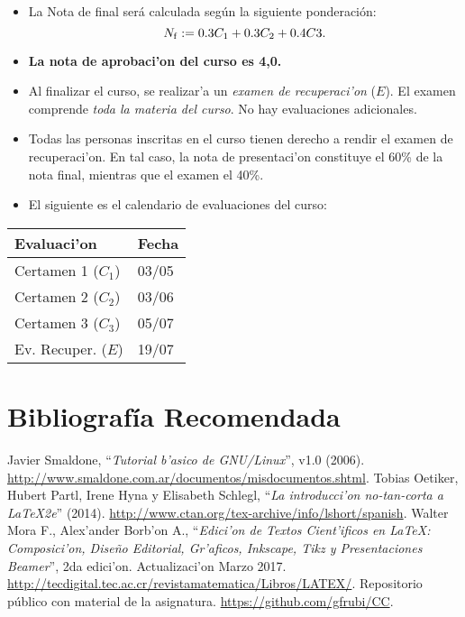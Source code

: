 \documentclass[letterpaper,11pt]{exam}
\begin{document}
\begin{multicols}{2}
\begin{itemize}
\item La Nota de final ser\'a calculada seg\'un la siguiente ponderaci\'on:
{\small
\begin{equation}
N_{\rm f} :=0.3C_1+0.3C_2 + 0.4C3.
\end{equation}
}
\item \textbf{La nota de aprobaci'on del curso es 4,0.}
\item Al finalizar el curso, se realizar'a un \textit{examen de recuperaci'on} ($E$). El examen comprende \textit{toda la materia del curso}. No hay evaluaciones adicionales.
\item Todas las personas inscritas en el curso tienen derecho a rendir el examen de recuperaci'on. En tal caso, la nota de presentaci'on constituye el 60\% de la nota final, mientras que el examen el 40\%.

\item El siguiente es el calendario de evaluaciones del curso:
\end{itemize} 
\begin{center}
\begin{scriptsize}
\begin{tabular}{|ll|}
\hline 
Evaluaci'on &  Fecha\\
\hline
Certamen 1 ($C_1$) & 03/05 \\ 
Certamen 2 ($C_2$) & 03/06 \\ 
Certamen 3 ($C_3$) & 05/07\\ 
Ev. Recuper. ($E$) & 19/07 \\ 
\hline 
\end{tabular} 
\end{scriptsize}
\end{center}

\section{Bibliografía Recomendada}

\begin{thebibliography}{77}	%
\small
{} Javier Smaldone, ``\textit{Tutorial b'asico de GNU/Linux}'',  v1.0 (2006).
\url{http://www.smaldone.com.ar/documentos/misdocumentos.shtml}.
 Tobias Oetiker, Hubert Partl, Irene Hyna y Elisabeth Schlegl, ``\textit{La introducci'on no-tan-corta a \LaTeX 2e}'' (2014). \url{http://www.ctan.org/tex-archive/info/lshort/spanish}.
 Walter Mora F., Alex'ander Borb'on A., ``\textit{Edici'on de Textos Cient'ificos en \LaTeX: Composici'on, Dise\~no Editorial, Gr'aficos, Inkscape, Tikz y Presentaciones Beamer}'', 2da edici'on. Actualizaci'on Marzo 2017. \url{http://tecdigital.tec.ac.cr/revistamatematica/Libros/LATEX/}.
 Repositorio p\'ublico con material de la asignatura. \url{https://github.com/gfrubi/CC}.
\end{thebibliography}	


\end{multicols}
\end{document}
